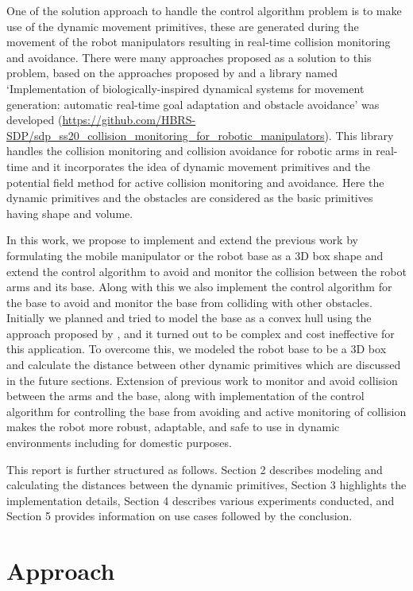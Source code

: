 \documentclass[a4paper, 11.5pt, conference]{ieeeconf}      %
\begin{document}
One of the solution approach to handle the control algorithm problem is to make use of the dynamic movement primitives, these are generated during the movement of the robot manipulators resulting in real-time collision monitoring and avoidance. There were many approaches proposed as a solution to this problem, based on the approaches proposed by \cite{Hoffmann} and \cite{Khatib} a library named `Implementation of biologically-inspired dynamical systems for
movement generation: automatic real-time goal adaptation and obstacle avoidance' was developed (\url{https://github.com/HBRS-SDP/sdp\_ss20\_collision\_monitoring\_for\_robotic\_manipulators}). This library handles the collision monitoring and collision avoidance for robotic arms in real-time and it incorporates the idea of dynamic movement primitives and the potential field method for active collision monitoring and avoidance. Here the dynamic primitives and the obstacles are considered as the basic primitives having shape and volume.

In this work, we propose to implement and extend the previous work by formulating the mobile manipulator or the robot base as a 3D box shape and extend the control algorithm to avoid and monitor the collision between the robot arms and its base. Along with this we also implement the control algorithm for the base to avoid and monitor the base from colliding with other obstacles. Initially we planned and tried to model the base as a convex hull using the approach proposed by \cite{GJK}, and it turned out to be complex and cost ineffective for this application. To overcome this, we modeled the robot base to be a 3D box and calculate the distance between other dynamic primitives which are discussed in the future sections. Extension of previous work to monitor and avoid collision between the arms and the base, along with implementation of the control algorithm for controlling the base from avoiding and active monitoring of collision makes the robot more robust, adaptable, and safe to use in dynamic environments including for domestic purposes.

This report is further structured as follows. Section 2 describes modeling and  calculating the distances between the dynamic primitives, Section 3 highlights the implementation details, Section 4 describes various experiments conducted, and Section 5 provides information on use cases followed by the conclusion.

\section{Approach}
\end{document}
